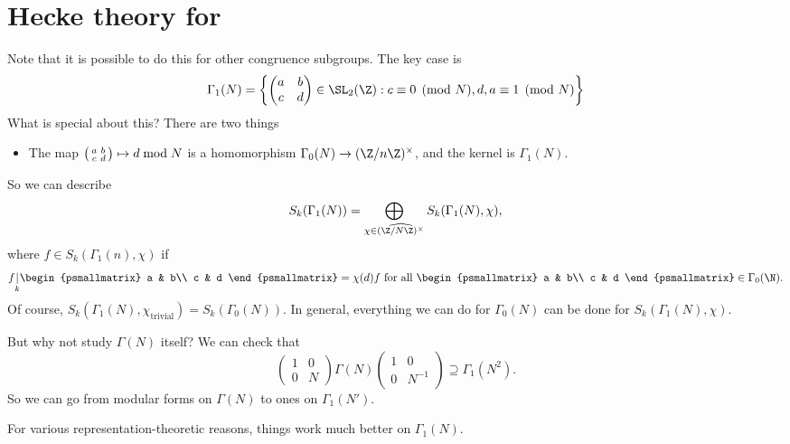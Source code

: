 \documentclass[a4paper]{article}
\begin{document}
\section{Hecke theory for }
Note that it is possible to do this for other congruence subgroups. The key case is
\[
  \Gamma_1(N) =
  \left\{
    \begin{pmatrix}
      a & b\\
      c & d
    \end{pmatrix} \in \SL_2(\Z) : c \equiv 0 \pmod N, d , a \equiv 1 \pmod N
  \right\}
\]
What is special about this? There are two things
\begin{itemize}
  \item The map $ \begin{psmallmatrix} a & b\\ c & d \end{psmallmatrix} \mapsto d \bmod N$ is a homomorphism $\Gamma_0(N) \to (\Z/n\Z)^\times$, and the kernel is $\Gamma_1(N)$.
\end{itemize}
So we can describe
\[
  S_k(\Gamma_1(N)) = \bigoplus_{\chi \in \widehat{(\Z/N\Z)^\times}} S_k(\Gamma_1(N), \chi),
\]
where $f \in S_k(\Gamma_1(n), \chi)$ if
\[
  f \underset{k}{|}
  \begin{psmallmatrix}
    a & b\\
    c & d
  \end{psmallmatrix} = \chi(d) f\text{ for all }
  \begin{psmallmatrix}
    a & b\\
    c & d
  \end{psmallmatrix} \in \Gamma_0(\N).
\]
Of course, $S_k(\Gamma_1(N), \chi_{\mathrm{trivial}}) = S_k(\Gamma_0(N))$. In general, everything we can do for $\Gamma_0(N)$ can be done for $S_k(\Gamma_1(N), \chi)$.

But why not study $\Gamma(N)$ itself? We can check that
\[
  \begin{pmatrix}
    1 & 0\\
    0 & N
  \end{pmatrix} \Gamma(N)
  \begin{pmatrix}
    1 & 0\\
    0 & N^{-1}
  \end{pmatrix} \supseteq \Gamma_1(N^2).
\]
So we can go from modular forms on $\Gamma(N)$ to ones on $\Gamma_1(N')$.

For various representation-theoretic reasons, things work much better on $\Gamma_1(N)$.
\end{document}
